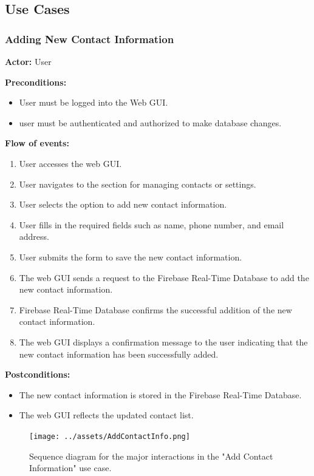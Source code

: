\subsection{Use Cases} \label{s:use-cases}

\subsubsection{Adding New Contact Information}

\textbf{Actor:} User

\textbf{Preconditions:}
\begin{itemize}
    \item User must be logged into the Web GUI.
    \item user must be authenticated and authorized to make database changes.
\end{itemize}

\textbf{Flow of events:}
\begin{enumerate}
    \item User accesses the web GUI.
    \item User navigates to the section for managing contacts or settings.
    \item User selects the option to add new contact information.
    \item User fills in the required fields such as name, phone number, and email address.
    \item User submits the form to save the new contact information.
    \item The web GUI sends a request to the Firebase Real-Time Database to add the new contact information.
    \item Firebase Real-Time Database confirms the successful addition of the new contact information.
    \item The web GUI displays a confirmation message to the user indicating that the new contact information has been
          successfully added.
\end{enumerate}

\textbf{Postconditions:}
\begin{itemize}
    \item The new contact information is stored in the Firebase Real-Time Database.
    \item The web GUI reflects the updated contact list.
\end{itemize}

\begin{figure}[H]
    \centering
    \texttt{[image: ../assets/AddContactInfo.png]}
    \caption{Sequence diagram for the major interactions in the "Add Contact Information" use case.}
\end{figure}

